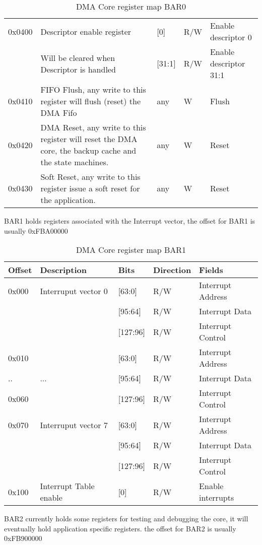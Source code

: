 \begin{table}[H]
\begin{tabularx}{\textwidth}{|l|X|l|l|l|}
	0x0400 & Descriptor enable register & [0] & R/W & Enable descriptor 0 \\
	& Will be cleared when Descriptor is handled& [31:1] & R/W & Enable descriptor 31:1\\
	\hline
	0x0410 & FIFO Flush, any write to this register will flush (reset) the DMA Fifo & any & W & Flush \\
	\hline
	0x0420 & DMA Reset, any write to this register will reset the DMA core, the backup cache and the state machines. & any & W & Reset \\
	\hline
	0x0430 & Soft Reset, any write to this register issue a soft reset for the application. & any & W & Reset \\
	\hline	\end{tabularx}
	\caption{DMA Core register map BAR0}\label{tab:dma_register_map_bar0}
\end{table}
\newpage
BAR1 holds registers associated with the Interrupt vector, the offset for BAR1 is usually 0xFBA00000
\begin{table}[H]
	\centering
	\begin{tabularx}{\textwidth}{|l|X|l|l|l|}
	\hline
	\textbf{Offset} & \textbf{Description} &\textbf{Bits}&\textbf{Direction}& \textbf{Fields}\\
	\hline
	0x000 & Interruput vector 0 & [63:0] & R/W & Interrupt Address \\
	      &                     & [95:64] & R/W & Interrupt Data \\
	      &                     & [127:96] & R/W & Interrupt Control\\
	\hline	
	0x010 &  & [63:0] & R/W & Interrupt Address \\
	.. & ... & [95:64] & R/W & Interrupt Data \\
	0x060 &  & [127:96] & R/W & Interrupt Control\\
	\hline	
	0x070 & Interruput vector 7& [63:0] & R/W & Interrupt Address \\
		      &                & [95:64] & R/W & Interrupt Data \\
		      &                & [127:96] & R/W & Interrupt Control\\
	\hline	
	0x100 & Interrupt Table enable & [0] & R/W & Enable interrupts \\
	\hline
	\end{tabularx}
	\caption{DMA Core register map BAR1}\label{tab:dma_register_map_bar1}
\end{table}

BAR2 currently holds some registers for testing and debugging the core, it will eventually hold application specific registers. the offset for BAR2 is usually 0xFB900000


